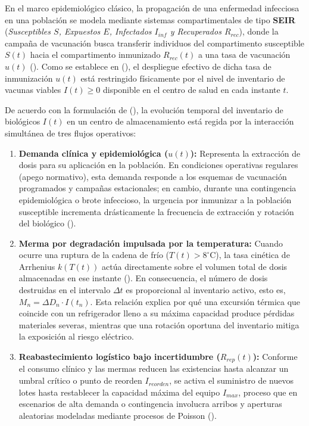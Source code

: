 \documentclass[
  spanish,
  letterpaper,
  DIV=11,
  numbers=noendperiod]{scrreprt}
\providecommand{\tightlist}{%
  \setlength{\itemsep}{0pt}\setlength{\parskip}{0pt}}
\theoremstyle{plain}
\theoremstyle{plain}
\theoremstyle{plain}
\theoremstyle{definition}
\theoremstyle{remark}
\begin{document}
En el marco epidemiológico clásico, la propagación de una enfermedad
infecciosa en una población se modela mediante sistemas compartimentales
de tipo \textbf{SEIR} (\emph{Susceptibles \(S\), Expuestos \(E\),
Infectados \(I_{inf}\) y Recuperados \(R_{rec}\)}), donde la campaña de
vacunación busca transferir individuos del compartimento susceptible
\(S(t)\) hacia el compartimento inmunizado \(R_{rec}(t)\) a una tasa de
vacunación \(u(t)\) (). Como se establece en (), el despliegue efectivo de dicha tasa de inmunización
\(u(t)\) está restringido físicamente por el nivel de inventario de
vacunas viables \(I(t) \ge 0\) disponible en el centro de salud en cada
instante \(t\).

De acuerdo con la formulación de (), la evolución temporal del inventario de biológicos
\(I(t)\) en un centro de almacenamiento está regida por la interacción
simultánea de tres flujos operativos:

\begin{enumerate}
\def\labelenumi{\arabic{enumi}.}
\tightlist
\item
  \textbf{Demanda clínica y epidemiológica (\(u(t)\)):} Representa la
  extracción de dosis para su aplicación en la población. En condiciones
  operativas regulares (apego normativo), esta demanda responde a los
  esquemas de vacunación programados y campañas estacionales; en cambio,
  durante una contingencia epidemiológica o brote infeccioso, la
  urgencia por inmunizar a la población susceptible incrementa
  drásticamente la frecuencia de extracción y rotación del biológico
  ().
\item
  \textbf{Merma por degradación impulsada por la temperatura:} Cuando
  ocurre una ruptura de la cadena de frío (\(T(t) > 8^\circ\text{C}\)),
  la tasa cinética de Arrhenius \(k(T(t))\) actúa directamente sobre el
  volumen total de dosis almacenadas en ese instante
  (). En
  consecuencia, el número de dosis destruidas en el intervalo
  \(\Delta t\) es proporcional al inventario activo, esto es,
  \(M_n = \Delta D_n \cdot I(t_n)\). Esta relación explica por qué una
  excursión térmica que coincide con un refrigerador lleno a su máxima
  capacidad produce pérdidas materiales severas, mientras que una
  rotación oportuna del inventario mitiga la exposición al riesgo
  eléctrico.
\item
  \textbf{Reabastecimiento logístico bajo incertidumbre
  (\(R_{rep}(t)\)):} Conforme el consumo clínico y las mermas reducen
  las existencias hasta alcanzar un umbral crítico o punto de reorden
  \(I_{reorden}\), se activa el suministro de nuevos lotes hasta
  restablecer la capacidad máxima del equipo \(I_{max}\), proceso que en
  escenarios de alta demanda o contingencia involucra arribos y
  aperturas aleatorias modeladas mediante procesos de Poisson
  ().
\end{enumerate}
\end{document}
